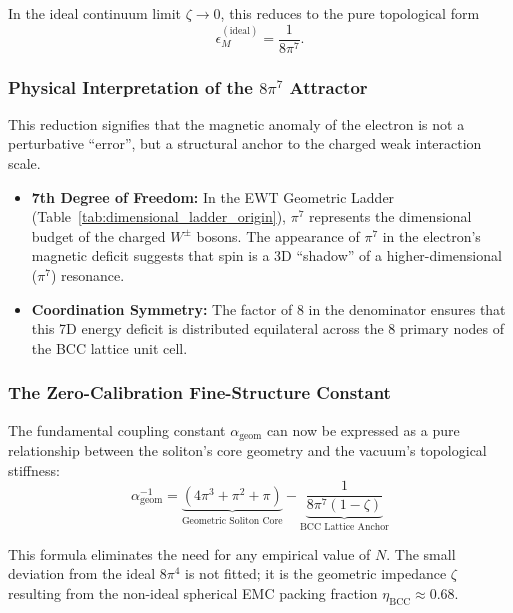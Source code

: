 \documentclass[10pt,a4paper]{article}
\begin{document}
In the ideal continuum limit \(\zeta\to 0\), this reduces to the pure topological form
\begin{equation}
	\epsilon_M^{(\text{ideal})} = \frac{1}{8\pi^7}.
\end{equation}

\subsubsection{Physical Interpretation of the \(8\pi^7\) Attractor}

This reduction signifies that the magnetic anomaly of the electron is not a perturbative ``error'', but a structural anchor to the charged weak interaction scale.
\begin{itemize}
	\item \textbf{7th Degree of Freedom:} In the EWT Geometric Ladder (Table~\ref{tab:dimensional_ladder_origin}), \(\pi^7\) represents the dimensional budget of the charged \(W^{\pm}\) bosons. The appearance of \(\pi^7\) in the electron's magnetic deficit suggests that spin is a 3D ``shadow'' of a higher-dimensional (\(\pi^7\)) resonance.
	\item \textbf{Coordination Symmetry:} The factor of \(8\) in the denominator ensures that this 7D energy deficit is distributed equilateral across the 8 primary nodes of the BCC lattice unit cell.
\end{itemize}

\subsubsection{The Zero-Calibration Fine-Structure Constant}

The fundamental coupling constant \(\alpha_{\text{geom}}\) can now be expressed as a pure relationship between the soliton's core geometry and the vacuum's topological stiffness:
\begin{equation}
	\label{final_alfa}
	\alpha_{\text{geom}}^{-1}
	=
	\underbrace{(4\pi^3 + \pi^2 + \pi)}_{\text{Geometric Soliton Core}}
	-
	\underbrace{\frac{1}{8\pi^7(1-\zeta)}}_{\text{BCC Lattice Anchor}}
\end{equation}

This formula eliminates the need for any empirical value of \(N\). The small deviation from the ideal \(8\pi^4\) is not fitted; it is the geometric impedance \(\zeta\) resulting from the non-ideal spherical EMC packing fraction \(\eta_{\text{BCC}}\approx 0.68\).
\end{document}
